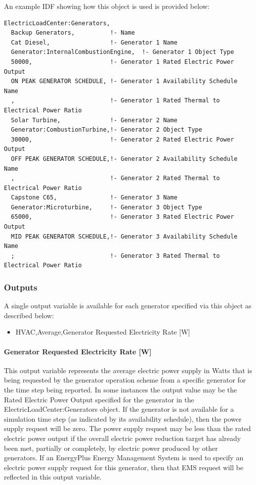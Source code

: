 An example IDF showing how this object is used is provided below:

\begin{lstlisting}
ElectricLoadCenter:Generators,
  Backup Generators,          !- Name
  Cat Diesel,                 !- Generator 1 Name
  Generator:InternalCombustionEngine,  !- Generator 1 Object Type
  50000,                      !- Generator 1 Rated Electric Power Output
  ON PEAK GENERATOR SCHEDULE, !- Generator 1 Availability Schedule Name
  ,                           !- Generator 1 Rated Thermal to Electrical Power Ratio
  Solar Turbine,              !- Generator 2 Name
  Generator:CombustionTurbine,!- Generator 2 Object Type
  30000,                      !- Generator 2 Rated Electric Power Output
  OFF PEAK GENERATOR SCHEDULE,!- Generator 2 Availability Schedule Name
  ,                           !- Generator 2 Rated Thermal to Electrical Power Ratio
  Capstone C65,               !- Generator 3 Name
  Generator:Microturbine,     !- Generator 3 Object Type
  65000,                      !- Generator 3 Rated Electric Power Output
  MID PEAK GENERATOR SCHEDULE,!- Generator 3 Availability Schedule Name
  ;                           !- Generator 3 Rated Thermal to Electrical Power Ratio
\end{lstlisting}

\subsubsection{Outputs}\label{outputs-2-007}

A single output variable is available for each generator specified via this object as described below:

\begin{itemize}
\tightlist
\item
  HVAC,Average,Generator Requested Electricity Rate {[}W{]}
\end{itemize}

\paragraph{Generator Requested Electricity Rate {[}W{]}}\label{generator-requested-electric-power-w}

This output variable represents the average electric power supply in Watts that is being requested by the generator operation scheme from a specific generator for the time step being reported. In some instances the output value may be the Rated Electric Power Output specified for the generator in the ElectricLoadCenter:Generators object. If the generator is not available for a simulation time step (as indicated by its availability schedule), then the power supply request will be zero. The power supply request may be less than the rated electric power output if the overall electric power reduction target has already been met, partially or completely, by electric power produced by other generators. If an EnergyPlus Energy Management System is used to specify an electric power supply request for this generator, then that EMS request will be reflected in this output variable.

